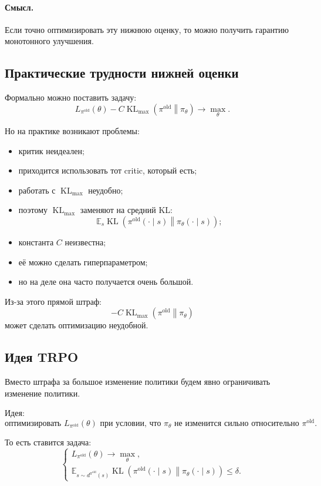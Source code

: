 \documentclass[12pt,a4paper]{article}
\begin{document}
\paragraph{Смысл.}

Если точно оптимизировать эту нижнюю оценку, то можно получить гарантию монотонного улучшения.

\subsection{Практические трудности нижней оценки}

Формально можно поставить задачу:
\[
L_{\pi^{\mathrm{old}}}(\theta)
-
C
\operatorname{KL}_{\max}
\left(
\pi^{\mathrm{old}}
\middle\|
\pi_\theta
\right)
\to
\max_\theta.
\]

Но на практике возникают проблемы:
\begin{itemize}
    \item критик неидеален;
    \item приходится использовать тот critic, который есть;
    \item работать с $\operatorname{KL}_{\max}$ неудобно;
    \item поэтому $\operatorname{KL}_{\max}$ заменяют на средний KL:
    \[
    \mathbb E_s
    \operatorname{KL}
    \left(
    \pi^{\mathrm{old}}(\cdot\mid s)
    \middle\|
    \pi_\theta(\cdot\mid s)
    \right);
    \]
    \item константа $C$ неизвестна;
    \item её можно сделать гиперпараметром;
    \item но на деле она часто получается очень большой.
\end{itemize}

Из-за этого прямой штраф:
\[
-
C\operatorname{KL}_{\max}
\left(
\pi^{\mathrm{old}}
\middle\|
\pi_\theta
\right)
\]
может сделать оптимизацию неудобной.

\subsection{Идея TRPO}

Вместо штрафа за большое изменение политики будем явно ограничивать изменение политики.

Идея:
\[
\text{оптимизировать } L_{\pi^{\mathrm{old}}}(\theta)
\text{ при условии, что }
\pi_\theta
\text{ не изменится сильно относительно }
\pi^{\mathrm{old}}.
\]

То есть ставится задача:
\[
\begin{cases}
L_{\pi^{\mathrm{old}}}(\theta)
\to
\max\limits_\theta,
\\[0.4em]
\mathbb E_{s\sim d^{\pi^{\mathrm{old}}}(s)}
\operatorname{KL}
\left(
\pi^{\mathrm{old}}(\cdot\mid s)
\middle\|
\pi_\theta(\cdot\mid s)
\right)
\le
\delta.
\end{cases}
\]
\end{document}
